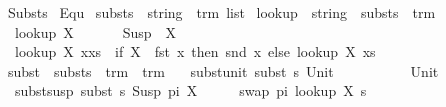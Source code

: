 %
\begin{isabellebody}%
%
%
\isadelimtheory
%
\endisadelimtheory
%
\isatagtheory
{}\isamarkupfalse%
\ Substs\isanewline
\isanewline
{}\ Equ\isanewline
\isanewline
{}%
\endisatagtheory
{\isafoldtheory}%
%
\isadelimtheory
\isanewline
%
\endisadelimtheory
\isanewline
\isanewline
\isanewline
{}\isamarkupfalse%
\ substs\ {\isacharequal}{\kern0pt}\ {\isachardoublequoteopen}{\isacharparenleft}{\kern0pt}string\ {\isasymtimes}\ trm{\isacharparenright}{\kern0pt}\ list{\isachardoublequoteclose}\isanewline
\isanewline
{}\isamarkupfalse%
\ look{\isacharunderscore}{\kern0pt}up\ {\isacharcolon}{\kern0pt}{\isacharcolon}{\kern0pt}\ {\isachardoublequoteopen}string\ {\isasymRightarrow}\ substs\ {\isasymRightarrow}\ trm{\isachardoublequoteclose}\ \isanewline
\ \ {\isachardoublequoteopen}look{\isacharunderscore}{\kern0pt}up\ X\ {\isacharbrackleft}{\kern0pt}{\isacharbrackright}{\kern0pt}\ \ \ \ \ {\isacharequal}{\kern0pt}\ Susp\ {\isacharbrackleft}{\kern0pt}{\isacharbrackright}{\kern0pt}\ X{\isachardoublequoteclose}\ {\isacharbar}{\kern0pt}\isanewline
\ \ {\isachardoublequoteopen}look{\isacharunderscore}{\kern0pt}up\ X\ {\isacharparenleft}{\kern0pt}x{\isacharhash}{\kern0pt}xs{\isacharparenright}{\kern0pt}\ {\isacharequal}{\kern0pt}\ {\isacharparenleft}{\kern0pt}if\ {\isacharparenleft}{\kern0pt}X\ {\isacharequal}{\kern0pt}\ fst\ x{\isacharparenright}{\kern0pt}\ then\ {\isacharparenleft}{\kern0pt}snd\ x{\isacharparenright}{\kern0pt}\ else\ look{\isacharunderscore}{\kern0pt}up\ X\ xs{\isacharparenright}{\kern0pt}{\isachardoublequoteclose}\isanewline
\isanewline
{}\isamarkupfalse%
\ subst\ {\isacharcolon}{\kern0pt}{\isacharcolon}{\kern0pt}\ {\isachardoublequoteopen}substs\ {\isasymRightarrow}\ trm\ {\isasymRightarrow}\ trm{\isachardoublequoteclose}\ \isanewline
\ \ subst{\isacharunderscore}{\kern0pt}unit{\isacharcolon}{\kern0pt}\ {\isachardoublequoteopen}subst\ s\ {\isacharparenleft}{\kern0pt}Unit{\isacharparenright}{\kern0pt}\ \ \ \ \ \ \ \ \ \ {\isacharequal}{\kern0pt}\ Unit{\isachardoublequoteclose}\ {\isacharbar}{\kern0pt}\isanewline
\ \ subst{\isacharunderscore}{\kern0pt}susp{\isacharcolon}{\kern0pt}\ {\isachardoublequoteopen}subst\ s\ {\isacharparenleft}{\kern0pt}Susp\ pi\ X{\isacharparenright}{\kern0pt}\ \ \ \ \ {\isacharequal}{\kern0pt}\ swap\ pi\ {\isacharparenleft}{\kern0pt}look{\isacharunderscore}{\kern0pt}up\ X\ s{\isacharparenright}{\kern0pt}{\isachardoublequoteclose}\ {\isacharbar}{\kern0pt}\isanewline

\end{isabellebody}
